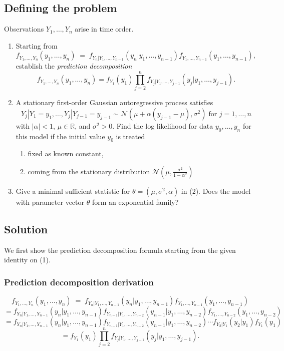\subsection{Defining the problem}

Observations $Y_1, \ldots, Y_n$ arise in time order. 

\begin{enumerate}
    \item Starting from
    $$f_{Y_1, \ldots, Y_n}(y_1, \ldots, y_n) \; = \; f_{Y_n | Y_1, \ldots, Y_{n-1}}(y_n | y_1, \ldots, y_{n-1})f_{Y_1, \ldots, Y_{n-1}}(y_1, \ldots, y_{n-1}),$$
    establish the \textit{prediction decomposition}
    $$f_{Y_1, \ldots, Y_n}(y_1, \ldots, y_n) = f_{Y_1}(y_1) \prod_{j=2}^{n}f_{Y_j | Y_1, \ldots, Y_{j-1}}(y_j | y_1, \ldots, y_{j-1}).$$
    \item A stationary first-order Gaussian autoregressive process satisfies
    $$Y_j | Y_1 = y_1, \ldots, Y_j | Y_{j-1} = y_{j-1} \sim \mathcal{N}(\mu + \alpha(y_{j-1}-\mu), \sigma^2) \; \text{for } j = 1, \ldots, n$$
    with $|\alpha| < 1$, $\mu \in \mathbb{R}$, and $\sigma^2 > 0$. Find the log likelihood for data $y_0, \ldots, y_n$ for this model if the initial value $y_0$ is treated
    \begin{enumerate}
        \item fixed as known constant,
        \item coming from the stationary distribution $\mathcal{N}(\mu, \frac{\sigma^2}{1-\alpha^2})$
    \end{enumerate}
    \item Give a minimal sufficient statistic for $\theta = (\mu, \sigma^2, \alpha)$ in (2). Does the model with parameter vector $\theta$ form
    an exponential family?
\end{enumerate}

\subsection{Solution}

We first show the prediction decomposition formula starting from the given identity on (1).
\subsubsection{Prediction decomposition derivation}

$$f_{Y_1, \ldots, Y_n}(y_1, \ldots, y_n) \; = \; f_{Y_n | Y_1, \ldots, Y_{n-1}}(y_n | y_1, \ldots, y_{n-1})f_{Y_1, \ldots, Y_{n-1}}(y_1, \ldots, y_{n-1})$$
$$= f_{Y_n | Y_1, \ldots, Y_{n-1}}(y_n | y_1, \ldots, y_{n-1}) f_{Y_{n-1} | Y_1, \ldots, Y_{n-2}}(y_{n-1} | y_1, \ldots, y_{n-2}) f_{Y_1, \ldots, Y_{n-2}}(y_1, \ldots, y_{n-2})$$
$$= f_{Y_n | Y_1, \ldots, Y_{n-1}}(y_n | y_1, \ldots, y_{n-1}) f_{Y_{n-1} | Y_1, \ldots, Y_{n-2}}(y_{n-1} | y_1, \ldots, y_{n-2}) \cdots f_{Y_2 | Y_1}(y_2 | y_1) f_{Y_1}(y_1)$$
$$= f_{Y_1}(y_1) \prod_{j=2}^{n}f_{Y_j | Y_1, \ldots, Y_{j-1}}(y_j | y_1, \ldots, y_{j-1}).$$ 


